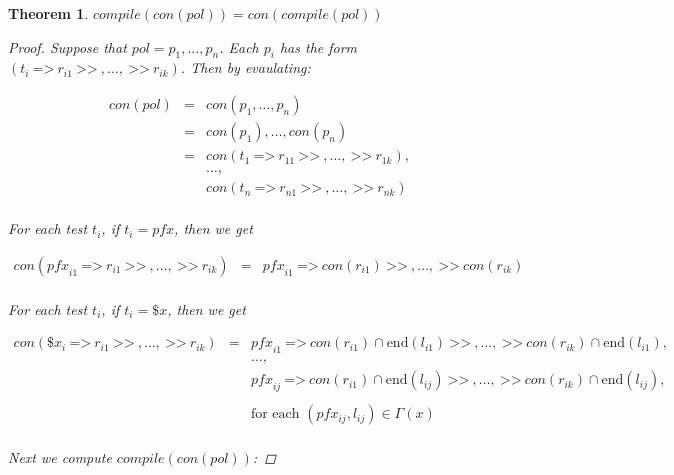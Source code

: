 \documentclass[twocolumn]{sig-alternate-10pt}
\newcommand{\Prefer}{\texttt{>>}}
\newcommand{\Path}{\texttt{=>}}
\newtheorem{thm}{Theorem}
\begin{document}
\vspace{2em}
\begin{thm}
  $compile(con(pol)) = con(compile(pol))$

  \begin{proof} \text{ }

    Suppose that $pol = p_1, \dots, p_n$. Each $p_i$ has the form $(t_i ~\Path~ r_{i1} ~\Prefer~,\dots, ~\Prefer~ r_{ik})$. Then by evaulating:

    \[ \begin{array}{lcl}
      con(pol) & = & con(p_1,\dots,p_n) \\
               & = & con(p_1), \dots, con(p_n) \\
               & = & con(t_1 ~\Path~ r_{11} ~\Prefer~,\dots, ~\Prefer~ r_{1k}), \\
               &   & \dots, \\
               &   & con(t_n ~\Path~ r_{n1} ~\Prefer~,\dots, ~\Prefer~ r_{nk}) \\
    \end{array} \]

    For each test $t_i$, if $t_i = pfx$, then we get 

    \[ \begin{array}{lcl}
        con({pfx}_{i1} ~\Path~ r_{i1} ~\Prefer~,\dots, ~\Prefer~ r_{ik}) 
           & = & {pfx}_{i1} ~\Path~ con(r_{i1}) ~\Prefer~,\dots, ~\Prefer~ con(r_{ik}) \\
    \end{array} \]

    For each test $t_i$, if $t_i = \$x$, then we get

    \[ \begin{array}{lcl}
        con(\$x_{i} ~\Path~ r_{i1} ~\Prefer~,\dots, ~\Prefer~ r_{ik}) 
            & = & {pfx}_{i1} ~\Path~ con(r_{i1}) \cap \text{end}(l_{i1}) ~\Prefer~,\dots, ~\Prefer~ con(r_{ik}) \cap \text{end}(l_{i1}), \\
            &   & \dots, \\ 
            &   & {pfx}_{ij} ~\Path~ con(r_{i1}) \cap \text{end}(l_{ij}) ~\Prefer~,\dots, ~\Prefer~ con(r_{ik}) \cap \text{end}(l_{ij}), \\
            &   & \\
            &   & \text{for each } (pfx_{ij}, l_{ij}) \in \Gamma(x) \\
    \end{array} \]

    Next we compute $compile(con(pol))$:


\end{proof}
\end{thm}
\end{document}
